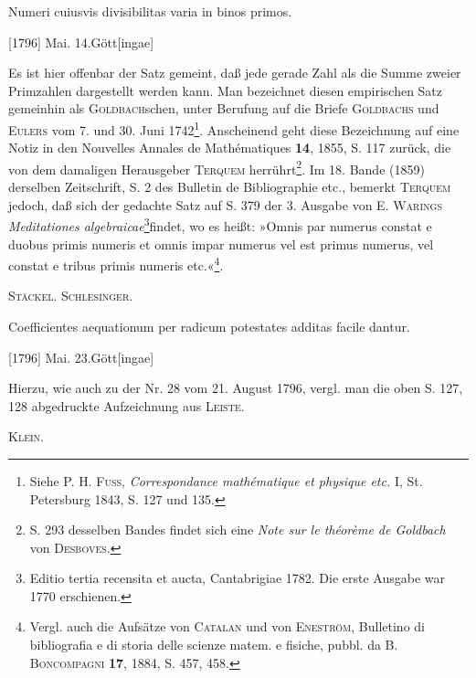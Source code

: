 \clearpage{}
\indent Numeri cuiusvis divisibilitas varia in binos primos.
\par\noindent\hfill[1796] Mai. 14.\quad Gött[ingae]

\medskip\begingroup\small
\indent Es ist hier offenbar der Satz gemeint, daß jede gerade Zahl als die Summe zweier Primzahlen dargestellt werden kann. Man bezeichnet diesen empirischen Satz gemeinhin als \textsc{Goldbach}schen, unter Berufung auf die Briefe \textsc{Goldbachs} und \textsc{Eulers} vom 7. und 30. Juni 1742\footnote{Siehe P. H. \textsc{Fuss}, \textit{Correspondance mathématique et physique etc.} I, St. Petersburg 1843, S. 127 und 135.}. Anscheinend geht diese Bezeichnung auf eine Notiz in den Nouvelles Annales de Mathématiques \textbf{14}, 1855, S. 117 zurück, die von dem damaligen Herausgeber \textsc{Terquem} herrührt\begingroup\renewcommand{\thefootnote}{**)}\footnote{S. 293 desselben Bandes findet sich eine \textit{Note sur le théorème de Goldbach} von \textsc{Desboves}.}\endgroup. Im 18. Bande (1859) derselben Zeitschrift, S. 2 des Bulletin de Bibliographie etc., bemerkt \textsc{Terquem} jedoch, daß sich der gedachte Satz auf S. 379 der 3. Ausgabe von E. \textsc{Warings} \textit{Meditationes algebraicae}\begingroup\renewcommand{\thefootnote}{***)}\footnote{Editio tertia recensita et aucta, Cantabrigiae 1782. Die erste Ausgabe war 1770 erschienen.}\endgroup findet, wo es heißt: »Omnis par numerus constat e duobus primis numeris et omnis impar numerus vel est primus numerus, vel constat e tribus primis numeris etc.«\begingroup\renewcommand{\thefootnote}{\ensuremath{\dagger})}\footnote{Vergl. auch die Aufsätze von \textsc{Catalan} und von \textsc{Eneström}, Bulletino di bibliografia e di storia delle scienze matem. e fisiche, pubbl. da B. \textsc{Boncompagni} \textbf{17}, 1884, S. 457, 458.}\endgroup.
\par\noindent\hfill\textsc{Stäckel. Schlesinger.}
\par\endgroup

\indent Coefficientes aequationum per radicum potestates additas facile dantur.
\par\noindent\hfill[1796] Mai. 23.\quad Gött[ingae]

\medskip\begingroup\small
\indent Hierzu, wie auch zu der Nr. 28 vom 21. August 1796, vergl. man die oben S. 127, 128 abgedruckte Aufzeichnung aus \textsc{Leiste}.
\par\noindent\hfill\textsc{Klein}.
\par\endgroup
